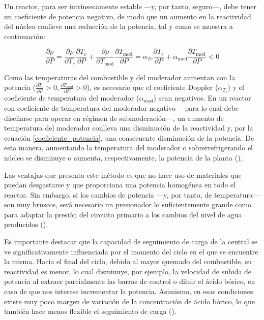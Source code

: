 \begin{itemize}
  Un reactor, para ser intrínsecamente estable ---y, por tanto, seguro---, debe tener un coeficiente de potencia negativo, de modo que un aumento en la \gls{reactividad} del núcleo conlleve una reducción de la potencia, tal y como se muestra a continuación:

  \begin{equation} \label{coeficiente_potencia}
    \frac{\partial \rho}{\partial P}=\frac{\partial \rho}{\partial T_c} \frac{\partial T_c}{\partial P}+\frac{\partial \rho}{\partial T_{\mathrm{mod}}} \frac{\partial T_{\mathrm{mod}}}{\partial P}=\alpha_{T c} \frac{\partial T_c}{\partial P}+\alpha_{\mathrm{mod}} \frac{\partial T_{\mathrm{mod}}}{\partial P}<0
  \end{equation}

  Como las temperaturas del combustible y del moderador aumentan con la potencia ($\frac{\partial T_c}{\partial P}>0, \frac{\partial T_{\mathrm{mod}}}{\partial P}>0$), es necesario que el coeficiente Doppler ($\alpha_{T_{c}}$) y el coeficiente de temperatura del moderador ($\alpha_{mod}$) sean negativos. En un reactor con coeficiente de temperatura del moderador negativo ---para lo cual debe diseñarse para operar en régimen de submoderación---, un aumento de temperatura del moderador conlleva una disminución de la \gls{reactividad} y, por la ecuación \ref{coeficiente_potencia}, una consecuente disminución de la potencia. De esta manera, aumentando la temperatura del moderador o sobrerrefrigerando el núcleo se disminuye o aumenta, respectivamente, la potencia de la planta (\cite{apuntes_centrales}).
  
  Las ventajas que presenta este método es que no hace uso de materiales que puedan desgastarse y que proporciona una potencia homogénea en todo el reactor. Sin embargo, si los cambios de potencia ---y, por tanto, de temperatura--- son muy bruscos, será necesario un presionador lo suficientemente grande como para adaptar la presión del circuito primario a los cambios del nivel de agua producidos (\cite{seguimiento_carga_josep_rey}).
\end{itemize}

Es importante destacar que la capacidad de seguimiento de carga de la central se ve significativamente influenciada por el momento del ciclo en el que se encuentre la misma. Hacia el final del ciclo, debido al mayor quemado del combustible, su reactividad es menor, lo cual disminuye, por ejemplo, la velocidad de subida de potencia al extraer parcialmente las barras de control o diluir el ácido bórico, en caso de que nos interese incrementar la potencia. Asimismo, en esas condiciones existe muy poco margen de variación de la concentración de ácido bórico, lo que también hace menos flexible el seguimiento de carga (\cite{apuntes_centrales}).

